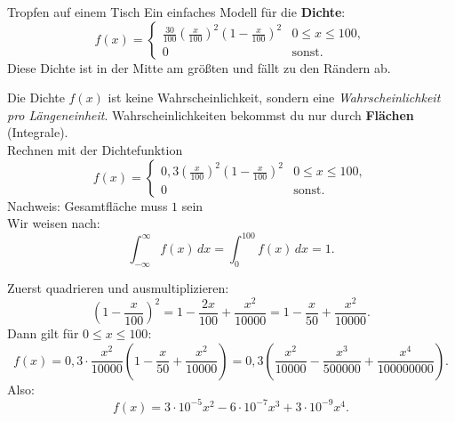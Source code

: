 \begin{bsp}{Tropfen auf einem Tisch}{}
    Ein einfaches Modell für die \textbf{ Dichte}:
\[
f(x)=
\begin{cases}
\displaystyle \frac{30}{100}\left(\frac{x}{100}\right)^{2}\left(1-\frac{x}{100}\right)^{2}
& 0\le x\le 100,\\[0.8em]
0 & \text{sonst.}
\end{cases}
\]
Diese Dichte ist in der Mitte am größten und fällt zu den Rändern ab.
\begin{center}
\end{center}
Die Dichte $f(x)$ ist keine Wahrscheinlichkeit, sondern eine \emph{Wahrscheinlichkeit pro Längeneinheit}.  
Wahrscheinlichkeiten bekommst du nur durch \textbf{Flächen} (Integrale).\\
Rechnen mit der Dichtefunktion
\[
f(x)=
\begin{cases}
\displaystyle 0{,}3\left(\frac{x}{100}\right)^2\left(1-\frac{x}{100}\right)^2 & 0\le x\le 100,\\[0.6em]
0 & \text{sonst.}
\end{cases}
\]
Nachweis: Gesamtfläche muss $1$ sein\\
Wir weisen nach:
\[
\int_{-\infty}^{\infty} f(x)\,dx=\int_{0}^{100} f(x)\,dx=1.
\]

Zuerst quadrieren und ausmultiplizieren:
\[
\left(1-\frac{x}{100}\right)^2
=1-\frac{2x}{100}+\frac{x^2}{10000}
=1-\frac{x}{50}+\frac{x^2}{10000}.
\]
Dann gilt für $0\le x\le 100$:
\[
f(x)=0{,}3\cdot\frac{x^2}{10000}\left(1-\frac{x}{50}+\frac{x^2}{10000}\right)
=0{,}3\left(\frac{x^2}{10000}-\frac{x^3}{500000}+\frac{x^4}{100000000}\right).
\]
Also:
\[
f(x)=3\cdot10^{-5}x^2-6\cdot10^{-7}x^3+3\cdot10^{-9}x^4.
\]


\end{bsp}
